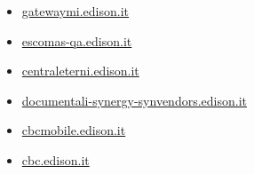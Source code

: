 \documentclass{article}
\begin{document}
\begin{itemize}
        \item \href{ http://gatewaymi.edison.it/ }{ gatewaymi.edison.it }
    
        
        
        \item \href{ https://escomas-qa.edison.it/ }{ escomas-qa.edison.it }
    
        
        
        \item \href{ http://centraleterni.edison.it/ }{ centraleterni.edison.it }
    
        
        
        \item \href{ https://documentali-synergy-synvendors.edison.it/account/login?ReturnUrl=\\%2Fvefa\\%2Fhome }{ documentali-synergy-synvendors.edison.it }
    
        
        
        \item \href{ http://cbcmobile.edison.it/ }{ cbcmobile.edison.it }
    
        
        
        \item \href{ http://cbc.edison.it/ }{ cbc.edison.it }
    
        
        

\end{itemize}
\end{document}
